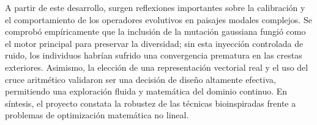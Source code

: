 A partir de este desarrollo, surgen reflexiones importantes sobre la calibración y el comportamiento de los operadores evolutivos en paisajes modales complejos. Se comprobó empíricamente que la inclusión de la mutación gaussiana fungió como el motor principal para preservar la diversidad; sin esta inyección controlada de ruido, los individuos habrían sufrido una convergencia prematura en las crestas exteriores. Asimismo, la elección de una representación vectorial real y el uso del cruce aritmético validaron ser una decisión de diseño altamente efectiva, permitiendo una exploración fluida y matemática del dominio continuo. En síntesis, el proyecto constata la robustez de las técnicas bioinspiradas frente a problemas de optimización matemática no lineal.

\clearpage
\nocite{*}

